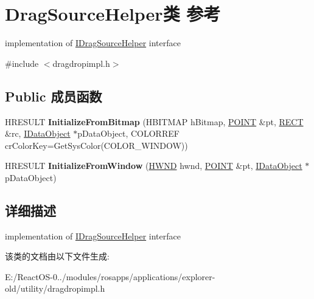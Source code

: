 \hypertarget{class_drag_source_helper}{}\section{Drag\+Source\+Helper类 参考}
\label{class_drag_source_helper}


implementation of \hyperlink{interface_i_drag_source_helper}{I\+Drag\+Source\+Helper} interface  




{\ttfamily \#include $<$dragdropimpl.\+h$>$}

\subsection*{Public 成员函数}
\begin{DoxyCompactItemize}
\item 
\mbox{\label{class_drag_source_helper_a1dbfc8f4a3d48fa96234e3a56725c9fd}} 
H\+R\+E\+S\+U\+LT {\bfseries Initialize\+From\+Bitmap} (H\+B\+I\+T\+M\+AP h\+Bitmap, \hyperlink{structtag_p_o_i_n_t}{P\+O\+I\+NT} \&pt, \hyperlink{structtag_r_e_c_t}{R\+E\+CT} \&rc, \hyperlink{interface_i_data_object}{I\+Data\+Object} $\ast$p\+Data\+Object, C\+O\+L\+O\+R\+R\+EF cr\+Color\+Key=Get\+Sys\+Color(C\+O\+L\+O\+R\+\_\+\+W\+I\+N\+D\+OW))
\item 
\mbox{\label{class_drag_source_helper_a79be9468b8c8b3c3f9979cfbe30b2cbd}} 
H\+R\+E\+S\+U\+LT {\bfseries Initialize\+From\+Window} (\hyperlink{interfacevoid}{H\+W\+ND} hwnd, \hyperlink{structtag_p_o_i_n_t}{P\+O\+I\+NT} \&pt, \hyperlink{interface_i_data_object}{I\+Data\+Object} $\ast$p\+Data\+Object)
\end{DoxyCompactItemize}


\subsection{详细描述}
implementation of \hyperlink{interface_i_drag_source_helper}{I\+Drag\+Source\+Helper} interface 

该类的文档由以下文件生成\+:\begin{DoxyCompactItemize}
\item 
E\+:/\+React\+O\+S-\/0../modules/rosapps/applications/explorer-\/old/utility/dragdropimpl.\+h\end{DoxyCompactItemize}
